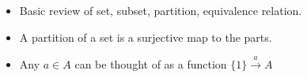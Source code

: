 \begin{itemize}
    \item Basic review of set, subset, partition, equivalence relation.
    \item A partition of a set is a surjective map to the parts.
    \item Any $a \in A$ can be thought of as a function $\{1\} \xrightarrow{a} A$
  \end{itemize}